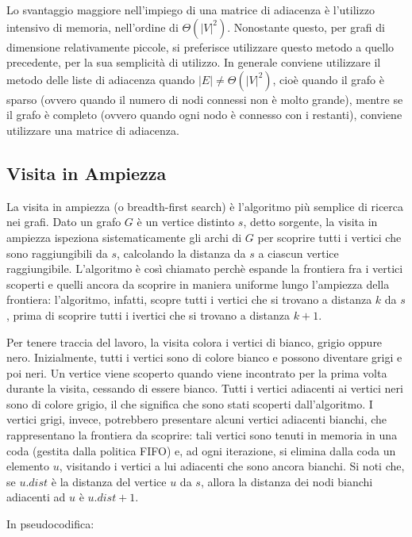 Lo svantaggio maggiore nell'impiego di una matrice di adiacenza è l'utilizzo intensivo di memoria, nell'ordine di \(\Theta(|V|^2)\). Nonostante questo, per grafi di dimensione relativamente piccole, si preferisce utilizzare questo metodo a quello precedente, per la sua semplicità di utilizzo. In generale conviene utilizzare il metodo delle liste di adiacenza quando \(|E|\neq \Theta(|V|^2)\), cioè quando il grafo è sparso (ovvero quando il numero di nodi connessi non è molto grande), mentre se il grafo è completo (ovvero quando ogni nodo è connesso con i restanti), conviene utilizzare una matrice di adiacenza.

\subsection{Visita in Ampiezza}
La visita in ampiezza (o breadth-first search) è l'algoritmo più semplice di ricerca nei grafi. Dato un grafo \(G\) è un vertice distinto \(s\), detto sorgente, la visita in ampiezza ispeziona sistematicamente gli archi di \(G\) per scoprire tutti i vertici che sono raggiungibili da \(s\), calcolando la distanza da \(s\) a ciascun vertice raggiungibile. L'algoritmo è così chiamato perchè espande la frontiera fra i vertici scoperti e quelli ancora da scoprire in maniera uniforme lungo l'ampiezza della frontiera: l'algoritmo, infatti, scopre tutti i vertici che si trovano a distanza \(k\) da \(s\), prima di scoprire tutti i ivertici che si trovano a distanza \(k+1\).

Per tenere traccia del lavoro, la visita colora i vertici di bianco, grigio oppure nero. Inizialmente, tutti i vertici sono di colore bianco e possono diventare grigi e poi neri. Un vertice viene scoperto quando viene incontrato per la prima volta durante la visita, cessando di essere bianco. Tutti i vertici adiacenti ai vertici neri sono di colore grigio, il che significa che sono stati scoperti dall'algoritmo. I vertici grigi, invece, potrebbero presentare alcuni vertici adiacenti bianchi, che rappresentano la frontiera da scoprire: tali vertici sono tenuti in memoria in una coda (gestita dalla politica FIFO) e, ad ogni iterazione, si elimina dalla coda un elemento \(u\), visitando i vertici a lui adiacenti che sono ancora bianchi. Si noti che, se \(u.dist\) è la distanza del vertice \(u\) da \(s\), allora la distanza dei nodi bianchi adiacenti ad \(u\) è \(u.dist+1\).

In pseudocodifica:


